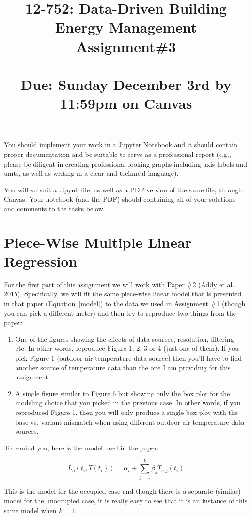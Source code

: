 \documentclass[times, 12pt, singlecolumn]{article}
\title{12-752: Data-Driven Building Energy Management\\ Assignment\#3\\\quad \\Due: Sunday December 3rd by 11:59pm on Canvas}
\begin{document}
\maketitle
You should implement your work in a Jupyter Notebook and it should contain proper documentation and be suitable to serve as a professional report (e.g., please be diligent in creating professional looking graphs including axis labels and units, as well as writing in a clear and technical language).

You will submit a {\texttt .ipynb} file, as well as a PDF version of the same file, through Canvas. Your notebook (and the PDF) should containing all of your solutions and comments to the tasks below.

\section{Piece-Wise Multiple Linear Regression}
For the first part of this assignment we will work with Paper \#2 (Addy et al., 2015). Specifically, we will fit the same piece-wise linear model that is presented in that paper (Equation~\ref{model}) to the data we used in Assignment \#1 (though you can pick a different meter) and then try to reproduce two things from the paper: 
\begin{enumerate}
	\item One of the figures showing the effects of data sourece, resolution, filtering, etc. In other words, reproduce Figure 1, 2, 3 or 4 (just one of them). If you pick Figure 1 (outdoor air temperature data source) then you'll have to find another source of temperature data than the one I am providnig for this assignment.  
	\item A single figure similar to Figure 6 but showing only the box plot for the modeling choice that you picked in the previous case. In other words, if you reproduced Figure 1, then you will only produce a single box plot with the base vs. variant mismatch when using different outdoor air temperature data sources.
\end{enumerate}

To remind you, here is the model used in the paper:

\begin{equation}
	\label{model}
	L_o(t_i, T(t_i)) = \alpha_i + \sum_{j=1}^k{\beta_j T_{c,j}(t_i)}	
\end{equation}

This is the model for the occupied case and though there is a separate (similar) model for the unoccupied case, it is really easy to see that it is an instance of this same model when $k = 1$.  
\end{document}
